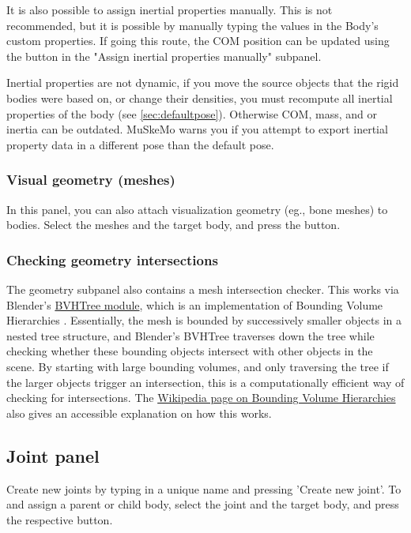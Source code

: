 \documentclass{article}
\begin{document}
It is also possible to assign inertial properties manually. This is not recommended, but it is possible by manually typing the values in the Body's custom properties. If going this route, the COM position can be updated using the button in the "Assign inertial properties manually" subpanel.


Inertial properties are not dynamic, if you move the source objects that the rigid bodies were based on, or change their densities, you must recompute all inertial properties of the body (see \ref{sec:defaultpose}). Otherwise COM, mass, and or inertia can be outdated. MuSkeMo warns you if you attempt to export inertial property data in a different pose than the default pose.

\subsubsection{Visual geometry (meshes)}
In this panel, you can also attach visualization geometry (eg., bone meshes) to bodies. Select the meshes and the target body, and press the button.

\subsubsection{Checking geometry intersections}
The geometry subpanel also contains a mesh intersection checker. This works via Blender's \href{https://docs.blender.org/api/current/mathutils.bvhtree.html}{BVHTree module}, which is an implementation of Bounding Volume Hierarchies \cite{ericsonBoundingVolumeHierarchies2005}. Essentially, the mesh is bounded by successively smaller objects in a nested tree structure, and Blender's BVHTree traverses down the tree while checking whether these bounding objects intersect with other objects in the scene. By starting with large bounding volumes, and only traversing the tree if the larger objects trigger an intersection, this is a computationally efficient way of checking for intersections. The \href{https://en.wikipedia.org/wiki/Bounding_volume_hierarchy}{Wikipedia page on Bounding Volume Hierarchies} also gives an accessible explanation on how this works.


\subsection{Joint panel}
\label{sec:jointpanel}

Create new joints by typing in a unique name and pressing 'Create new joint'. To and assign a parent or child body, select the joint and the target body, and press the respective button. 
\end{document}
